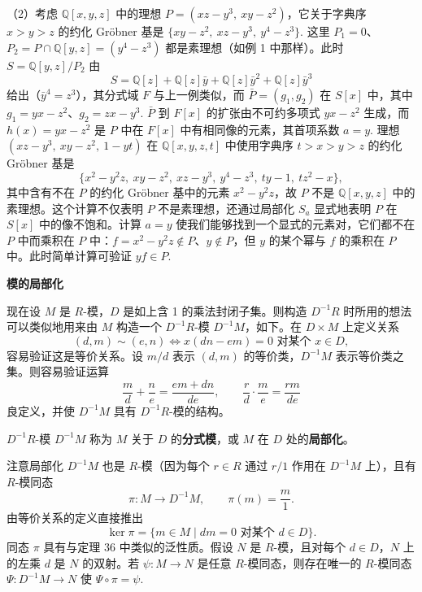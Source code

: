 （2）考虑 \(\mathbb{Q}[x,y,z]\) 中的理想 \(P = (xz-y^3,\ xy-z^2)\)，它关于字典序 \(x > y > z\) 的约化 Gröbner 基是 \(\{xy-z^2,\ xz-y^3,\ y^4-z^3\}\). 这里 \(P_1 = 0\)、\(P_2 = P \cap \mathbb{Q}[y,z] = (y^4-z^3)\) 都是素理想（如例 1 中那样）。此时 \(S = \mathbb{Q}[y,z]/P_2\) 由
\[
S = \mathbb{Q}[z]+\mathbb{Q}[z]\bar y+\mathbb{Q}[z]\bar y^2+\mathbb{Q}[z]\bar y^3
\]
给出（\(\bar y^4 = z^3\)），其分式域 \(F\) 与上一例类似，而 \(\bar P = (g_1, g_2)\) 在 \(S[x]\) 中，其中 \(g_1 = yx-z^2\)、\(g_2 = zx-y^3\). \(\bar P\) 到 \(F[x]\) 的扩张由不可约多项式 \(yx-z^2\) 生成，而 \(h(x) = yx-z^2\) 是 \(P\) 中在 \(F[x]\) 中有相同像的元素，其首项系数 \(a = y\). 理想 \((xz-y^3,\ xy-z^2,\ 1-yt)\) 在 \(\mathbb{Q}[x,y,z,t]\) 中使用字典序 \(t > x > y > z\) 的约化 Gröbner 基是
\[
\{x^2-y^2z,\ xy-z^2,\ xz-y^3,\ y^4-z^3,\ ty-1,\ tz^2-x\},
\]
其中含有不在 \(P\) 的约化 Gröbner 基中的元素 \(x^2-y^2z\)，故 \(P\) 不是 \(\mathbb{Q}[x,y,z]\) 中的素理想。这个计算不仅表明 \(P\) 不是素理想，还通过局部化 \(S_a\) 显式地表明 \(P\) 在 \(S[x]\) 中的像不饱和。计算 \(a = y\) 使我们能够找到一个显式的元素对，它们都不在 \(P\) 中而乘积在 \(P\) 中：\(f = x^2-y^2z \notin P\)、\(y \notin P\)，但 \(y\) 的某个幂与 \(f\) 的乘积在 \(P\) 中。此时简单计算可验证 \(yf \in P\).

\noindent\textbf{模的局部化}

现在设 \(M\) 是 \(R\)-模，\(D\) 是如上含 1 的乘法封闭子集。则构造 \(D^{-1}R\) 时所用的想法可以类似地用来由 \(M\) 构造一个 \(D^{-1}R\)-模 \(D^{-1}M\)，如下。在 \(D \times M\) 上定义关系
\[
(d, m) \sim (e, n) \iff x(dn-em) = 0 \text{ 对某个 } x \in D,
\]
容易验证这是等价关系。设 \(m/d\) 表示 \((d,m)\) 的等价类，\(D^{-1}M\) 表示等价类之集。则容易验证运算
\[
\frac{m}{d}+\frac{n}{e} = \frac{em+dn}{de}, \qquad \frac{r}{d}\cdot\frac{m}{e} = \frac{rm}{de}
\]
良定义，并使 \(D^{-1}M\) 具有 \(D^{-1}R\)-模的结构。

\begin{definition}
\(D^{-1}R\)-模 \(D^{-1}M\) 称为 \(M\) 关于 \(D\) 的\textbf{分式模}，或 \(M\) 在 \(D\) 处的\textbf{局部化}。
\end{definition}

注意局部化 \(D^{-1}M\) 也是 \(R\)-模（因为每个 \(r \in R\) 通过 \(r/1\) 作用在 \(D^{-1}M\) 上），且有 \(R\)-模同态
\[
\pi : M \to D^{-1}M, \qquad \pi(m) = \frac{m}{1}.
\]
由等价关系的定义直接推出
\[
\ker\pi = \{m \in M \mid dm = 0 \text{ 对某个 } d \in D\}.
\]
同态 \(\pi\) 具有与定理 36 中类似的泛性质。假设 \(N\) 是 \(R\)-模，且对每个 \(d \in D\)，\(N\) 上的左乘 \(d\) 是 \(N\) 的双射。若 \(\psi : M \to N\) 是任意 \(R\)-模同态，则存在唯一的 \(R\)-模同态 \(\Psi : D^{-1}M \to N\) 使 \(\Psi \circ \pi = \psi\).


